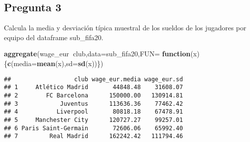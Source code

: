 \documentclass[
]{article}
\newenvironment{Shaded}{\begin{snugshade}}{\end{snugshade}}
\newcommand{\ControlFlowTok}[1]{\textcolor[rgb]{0.13,0.29,0.53}{\textbf{#1}}}
\newcommand{\DataTypeTok}[1]{\textcolor[rgb]{0.13,0.29,0.53}{#1}}
\newcommand{\DecValTok}[1]{\textcolor[rgb]{0.00,0.00,0.81}{#1}}
\newcommand{\KeywordTok}[1]{\textcolor[rgb]{0.13,0.29,0.53}{\textbf{#1}}}
\newcommand{\NormalTok}[1]{#1}
\newcommand{\OperatorTok}[1]{\textcolor[rgb]{0.81,0.36,0.00}{\textbf{#1}}}
\newcommand{\StringTok}[1]{\textcolor[rgb]{0.31,0.60,0.02}{#1}}
\begin{document}
\begin{Shaded}
\end{Shaded}

\hypertarget{pregunta-3}{%
\subsection{Pregunta 3}\label{pregunta-3}}

Calcula la media y desviación típica muestral de los sueldos de los
jugadores por equipo del dataframe sub\_fifa20.

\begin{Shaded}
\begin{Highlighting}[]
\KeywordTok{aggregate}\NormalTok{(wage_eur}\OperatorTok{~}\NormalTok{club,}\DataTypeTok{data=}\NormalTok{sub_fifa20,}\DataTypeTok{FUN=} \ControlFlowTok{function}\NormalTok{(x) \{}\KeywordTok{c}\NormalTok{(}\DataTypeTok{media=}\KeywordTok{mean}\NormalTok{(x),}\DataTypeTok{sd=}\KeywordTok{sd}\NormalTok{(x))\})}
\end{Highlighting}
\end{Shaded}

\begin{verbatim}
##                  club wage_eur.media wage_eur.sd
## 1     Atlético Madrid       44848.48    31608.07
## 2        FC Barcelona      150000.00   130914.81
## 3            Juventus      113636.36    77462.42
## 4           Liverpool       80818.18    67478.91
## 5     Manchester City      120727.27    99257.01
## 6 Paris Saint-Germain       72606.06    65992.40
## 7         Real Madrid      162242.42   111794.46
\end{verbatim}

\begin{Shaded}
\end{Shaded}
\end{document}
